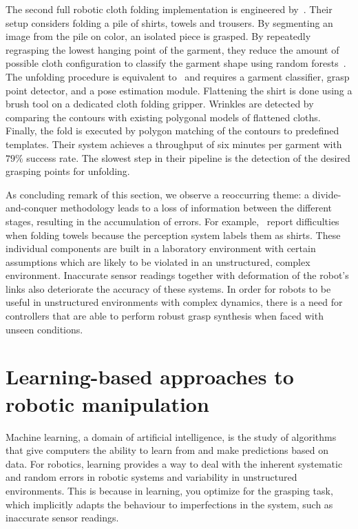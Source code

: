 \documentclass[\home/main.tex]{subfiles}
\begin{document}
The second full robotic cloth folding implementation is engineered by~\textcite{Doumanoglou2016}. Their setup considers folding a pile of shirts, towels and trousers. By segmenting an image from the pile on color, an isolated piece is grasped. By repeatedly regrasping the lowest hanging point of the garment, they reduce the amount of possible cloth configuration to classify the garment shape using random forests~\autocite{Breiman2001}. The unfolding procedure is equivalent to~\autocite{Maitin2010} and requires a garment classifier, grasp point detector, and a pose estimation module. Flattening the shirt is done using a brush tool on a dedicated cloth folding gripper. Wrinkles are detected by comparing the contours with existing polygonal models of flattened cloths. Finally, the fold is executed by polygon matching of the contours to predefined templates. Their system achieves a throughput of six minutes per garment with $79\%$ success rate. The slowest step in their pipeline is the detection of the desired grasping points for unfolding.

As concluding remark of this section, we observe a reoccurring theme: a divide-and-conquer methodology leads to a loss of information between the different stages, resulting in the accumulation of errors. For example,~\textcite{Doumanoglou2016} report difficulties when folding towels because the perception system labels them as shirts. These individual components are built in a laboratory environment with certain assumptions which are likely to be violated in an unstructured, complex environment. Inaccurate sensor readings together with deformation of the robot’s links also deteriorate the accuracy of these systems. In order for robots to be useful in unstructured environments with complex dynamics, there is a need for controllers that are able to perform robust grasp synthesis when faced with unseen conditions.

\section{Learning-based approaches to robotic manipulation} \label{sec:lit_learning}

Machine learning, a domain of artificial intelligence, is the study of algorithms that give computers the ability to learn from and make predictions based on data. For robotics, learning provides a way to deal with the inherent systematic and random errors in robotic systems and variability in unstructured environments. This is because in learning, you optimize for the grasping task, which implicitly adapts the behaviour to imperfections in the system, such as inaccurate sensor readings.
\end{document}
